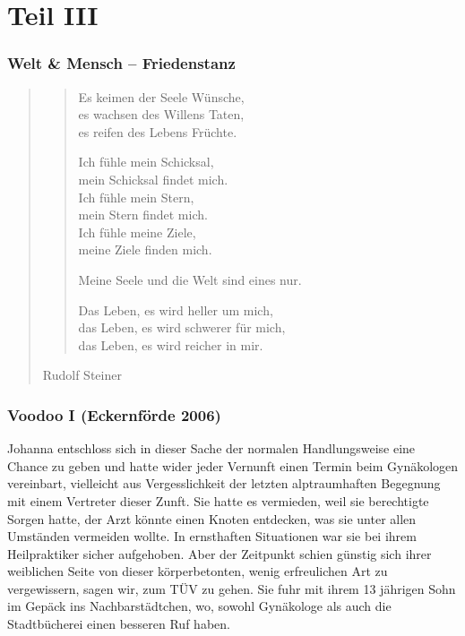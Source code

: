 \documentclass[10pt,titlepage,a5paper]{book}
\newenvironment{tg}{\begin{quote}\em}{\end{quote}}
\newenvironment{dichter}{\begin{flushright}}{\end{flushright}}
\begin{document}
\part*{Teil III}



\section*{Welt \& Mensch – Friedenstanz}


\begin{tg}
\begin{verse}
Es keimen der Seele Wünsche,\\
es wachsen des Willens Taten,\\
es reifen des Lebens Früchte.

Ich fühle mein Schicksal,\\
mein Schicksal findet mich.\\
Ich fühle mein Stern,\\
mein Stern findet mich.\\
Ich fühle meine Ziele,\\
meine Ziele finden mich.

Meine Seele und die Welt sind eines nur.

Das Leben, es wird heller um mich,\\
das Leben, es wird schwerer für mich,\\
das Leben, es wird reicher in mir.\\
\end{verse}


\begin{dichter}Rudolf Steiner\end{dichter}
\end{tg}

\section*{Voodoo I (Eckernförde 2006)}




Johanna entschloss sich in dieser Sache der normalen Handlungsweise eine Chance zu geben und hatte wider jeder Vernunft  einen Termin beim Gynäkologen vereinbart, vielleicht aus Vergesslichkeit der letzten alptraumhaften Begegnung mit einem Vertreter dieser Zunft. Sie hatte es vermieden, weil sie berechtigte Sorgen hatte, der Arzt könnte einen Knoten entdecken, was sie unter allen Umständen vermeiden wollte. In ernsthaften Situationen war sie bei ihrem Heilpraktiker sicher aufgehoben. Aber der Zeitpunkt schien günstig sich ihrer weiblichen Seite von dieser körperbetonten, wenig erfreulichen Art zu vergewissern, sagen wir, zum TÜV zu gehen. Sie fuhr mit ihrem 13 jährigen Sohn im Gepäck ins Nachbarstädtchen, wo, sowohl Gynäkologe als auch die Stadtbücherei einen besseren Ruf haben.
\end{document}
